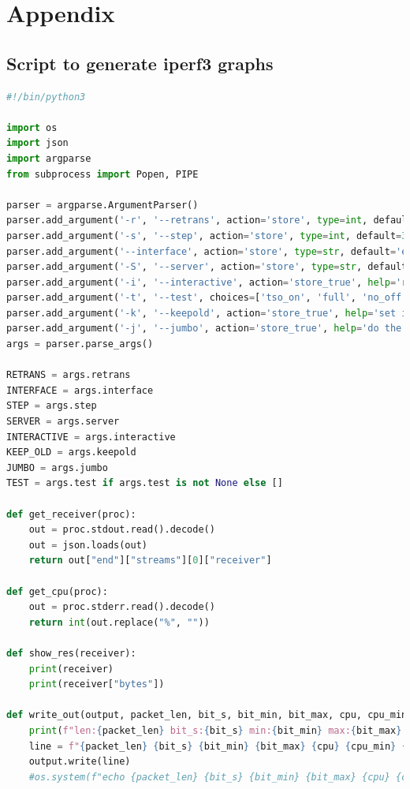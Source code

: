 \documentclass{exam}
\begin{document}
\pagebreak
\section{Appendix}
\subsection{Script to generate iperf3 graphs}
\begin{lstlisting}[language=python]
#!/bin/python3

import os
import json
import argparse
from subprocess import Popen, PIPE

parser = argparse.ArgumentParser()
parser.add_argument('-r', '--retrans', action='store', type=int, default=5, help='number of retransmissions')
parser.add_argument('-s', '--step', action='store', type=int, default=300, help='number of steps to reach 3000 bytes')
parser.add_argument('--interface', action='store', type=str, default='eth0', help='interface to modify the offloading')
parser.add_argument('-S', '--server', action='store', type=str, default='10.0.3.1', help='server to connect')
parser.add_argument('-i', '--interactive', action='store_true', help='run gnuplot in interactive mode')
parser.add_argument('-t', '--test', choices=['tso_on', 'full', 'no_off', 'stressed', 'jumbo', 'jumbo_long'], nargs='+', help='test for different modes')
parser.add_argument('-k', '--keepold', action='store_true', help='set if you want to don\'t override old files')
parser.add_argument('-j', '--jumbo', action='store_true', help='do the jumbo test')
args = parser.parse_args()

RETRANS = args.retrans
INTERFACE = args.interface
STEP = args.step
SERVER = args.server
INTERACTIVE = args.interactive
KEEP_OLD = args.keepold
JUMBO = args.jumbo
TEST = args.test if args.test is not None else []

def get_receiver(proc):
    out = proc.stdout.read().decode()
    out = json.loads(out)
    return out["end"]["streams"][0]["receiver"]

def get_cpu(proc):
    out = proc.stderr.read().decode()
    return int(out.replace("%", ""))

def show_res(receiver):
    print(receiver)
    print(receiver["bytes"])

def write_out(output, packet_len, bit_s, bit_min, bit_max, cpu, cpu_min, cpu_max, out_name):
    print(f"len:{packet_len} bit_s:{bit_s} min:{bit_min} max:{bit_max} cpu:{cpu} cpu_min:{cpu_min} cpu_max:{cpu_max}")
    line = f"{packet_len} {bit_s} {bit_min} {bit_max} {cpu} {cpu_min} {cpu_max}\n"
    output.write(line)
    #os.system(f"echo {packet_len} {bit_s} {bit_min} {bit_max} {cpu} {cpu_min} {cpu_max}>> {out_name}")


\end{lstlisting}
\end{document}

